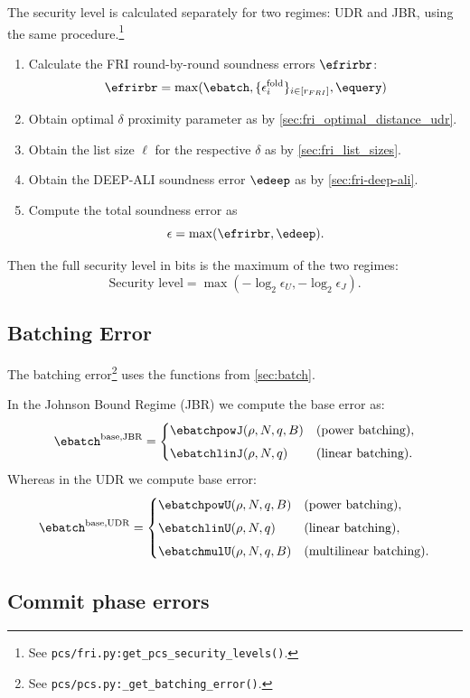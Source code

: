 The security level is calculated separately for two regimes: UDR and JBR, using the same procedure.\footnote{See \texttt{pcs/fri.py:get\_pcs\_security\_levels()}.}
\begin{enumerate}
    \item Calculate the FRI round-by-round soundness errors $\efrirbr $:
    $$
    \efrirbr =\max(\ebatch,  \{\epsilon_{i}^{\mathrm{fold}}\}_{i\in[r_{FRI}]}, \equery)
     $$
    \item Obtain optimal $\delta $ proximity parameter as by   \cref{sec:fri_optimal_distance_udr}.
    \item Obtain the list size $\ell$ for the respective  $\delta $ as  by \cref{sec:fri_list_sizes}.
    \item Obtain the DEEP-ALI soundness error $\edeep$ as by \cref{sec:fri-deep-ali}.
    \item Compute the total soundness error as
     $$
    \epsilon  = \max(\efrirbr, \edeep) .
    $$
\end{enumerate}
Then the  full security level in bits is the maximum of the two regimes:
$$
\text{Security level} = \max(-\log_2 \epsilon_U, -\log_2 \epsilon_J).
$$

\subsection{Batching Error }

The batching error\footnote{See \texttt{pcs/pcs.py:\_get\_batching\_error()}.} uses the functions from \cref{sec:batch}.

In the Johnson Bound Regime (JBR) we compute the base error as:
\[
\ebatch^{\text{base,JBR}} =
\begin{cases}
   \ebatchpowJ(\rho,N,q,B) & \text{(power batching)}, \\[4pt]
  \ebatchlinJ(\rho,N,q)& \text{(linear batching)}.
\end{cases}
\]
Whereas in the UDR we compute base error:
\[
\ebatch^{\text{base,UDR}}=
\begin{cases}
   \ebatchpowU(\rho,N,q,B) & \text{(power batching)}, \\[4pt]
  \ebatchlinU(\rho,N,q)& \text{(linear batching)}, \\[4pt]
  \ebatchmulU(\rho,N,q,B)& \text{(multilinear batching)}.
\end{cases}
\]

\subsection{Commit phase errors}

